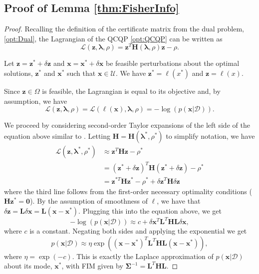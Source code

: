 \documentclass[lettersize,journal]{IEEEtran}
\begin{document}
\subsection{Proof of Lemma \ref{thm:FisherInfo}}\label{SM:lemma1Proof}
\begin{proof}
Recalling the definition of the certificate matrix from the dual problem, \eqref{opt:Dual}, the Lagrangian of the QCQP \eqref{opt:QCQP} can be written as
\begin{equation*}
	\mathcal{L}(\bm{z},\bm{\lambda}, \rho) = \bm{z}^T \bm{H}(\bm{\lambda}, \rho) \bm{z} - \rho.
\end{equation*}

Let $\bm{z} = \bm{z}^*+\delta\bm{z}$ and $\bm{x} = \bm{x}^*+\delta\bm{x}$ be feasible perturbations about the optimal solutions, $\bm{z}^*$ and $\bm{x}^*$ such that $\bm{x}\in\mathcal{U}$. We have $\bm{z}^* = \bm{\ell}(x^*)$ and $\bm{z}= \bm{\ell}(x)$. 

Since $\bm{z} \in \Omega$ is feasible, the Lagrangian is equal to its objective and, by assumption, we have
\begin{equation*}
	\mathcal{L}(\bm{z},\bm{\lambda}, \rho)=\mathcal{L}(\bm{\ell}(\bm{x}),\bm{\lambda}, \rho) = -\log(p(\bm{x} \vert \bm{\mathcal{D}})).
\end{equation*}

We proceed by considering second-order Taylor expansions of the left side of the equation above similar to \cite[Theorem 12.5]{nocedalNumericalOptimization2006}. Letting  $\bm{H}= \bm{H}(\bm{\lambda}^*, \rho^*)$ to simplify notation, we have
\begin{align*}
	\mathcal{L}(\bm{z},\bm{\lambda}^*, \rho^*) &\approx \bm{z}^T \bm{H} \bm{z} - \rho^* \\ 
	&= (\bm{z}^*+\delta\bm{z})^T \bm{H} (\bm{z}^*+\delta\bm{z}) - \rho^* \\ 
	&= \bm{z}^{*T} \bm{H}\bm{z}^{*} -\rho^* + \delta\bm{z}^T \bm{H}\delta\bm{z}
\end{align*}
where the third line follows from the first-order necessary optimality conditions ($\bm{H} \bm{z}^*=\bm{0}$). By the assumption of smoothness of $\bm{\ell}$, we have that $\delta\bm{z} = \bm{L} \delta\bm{x} = \bm{L}(\bm{x}-\bm{x}^*)$. Plugging this into the equation above, we get
\begin{equation*}
	-\log(p(\bm{x} \vert \bm{\mathcal{D}})) \approx c + \delta\bm{x}^T \bm{L}^T\bm{H}\bm{L}\delta\bm{x},
\end{equation*}
where $c$ is a constant. Negating both sides and applying the exponential we get
\begin{equation*}
	p(\bm{x} \vert \bm{\mathcal{D}}) \approx \eta\exp\left((\bm{x}-\bm{x}^*)^T \bm{L}^T\bm{H}\bm{L}(\bm{x}-\bm{x}^*)\right),
\end{equation*}
where $\eta = \exp(-c)$. This is exactly the Laplace approximation of $p(\bm{x} \vert \bm{\mathcal{D}})$ about its mode, $\bm{x}^*$, with FIM given by $\bm{\Sigma}^{-1} = \bm{L}^T\bm{H}\bm{L}$.
\end{proof}
\end{document}
